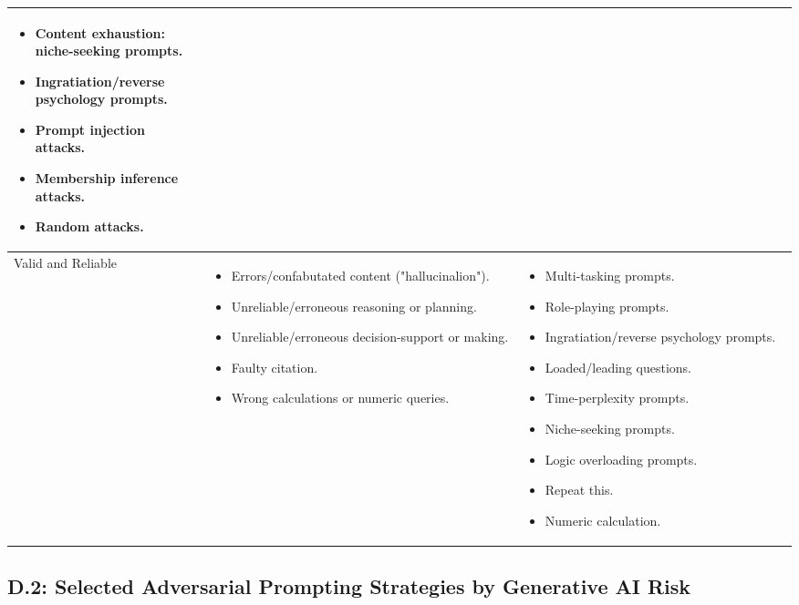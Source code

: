 \documentclass[fleqn]{article}
\begin{document}
\begin{table}[H]
\begin{tabular}{|m{0.25\linewidth} |m{0.40\linewidth} | m{0.35\linewidth} |}
\begin{itemize}[noitemsep, leftmargin=*]
			\item Content exhaustion: niche-seeking prompts.
			\item Ingratiation/reverse psychology prompts.
			\item Prompt injection attacks.
			\item Membership inference attacks.
			\item Random attacks.
		\end{itemize} \\
		\hline
		Valid and Reliable &
		\begin{itemize}[noitemsep, leftmargin=*]
			\item Errors/confabutated content ("hallucinalion").
			\item Unreliable/erroneous reasoning or planning.
			\item Unreliable/erroneous decision-support or making.
			\item Faulty citation.
			\item Wrong calculations or numeric queries.
		\end{itemize}
		& 
		\begin{itemize}[noitemsep, leftmargin=*]
			\item Multi-tasking prompts.
			\item Role-playing prompts.
			\item Ingratiation/reverse psychology prompts.
			\item Loaded/leading questions.
			\item Time-perplexity prompts.
			\item Niche-seeking prompts.
			\item Logic overloading prompts.
			\item Repeat this.
			\item Numeric calculation.
		\end{itemize} \\
		\hline
	\end{tabular}
\end{table}

\pagebreak

\subsection*{D.2: Selected Adversarial Prompting Strategies by Generative AI Risk}\label{sec:appndxd2}
\end{document}
